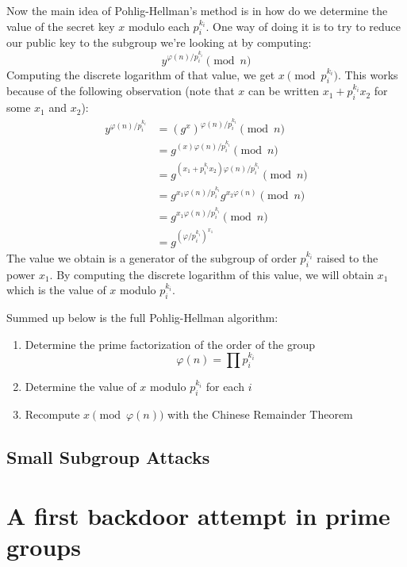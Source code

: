 \documentclass[a4paper,11pt,twocolumn]{article}
\begin{document}
Now the main idea of Pohlig-Hellman's method is in how do we determine the value of the secret key $x$ modulo each $p_i^{k_i}$. One way of doing it is to try to reduce our public key to the subgroup we're looking at by computing:
$$y^{\varphi(n)/p_i^{k_i}} \pmod{n}$$
Computing the discrete logarithm of that value, we get $x \pmod{p_i^{k_i}}$. This works because of the following observation (note that $x$ can be written $x_1 + p_i^{k_i} x_2$ for some $x_1$ and $x_2$):
\begin{align*}
    y^{\varphi(n)/p_i^{k_i}} &= (g^{x})^{\varphi(n)/p_i^{k_i}} \pmod{n}\\
    &= g^{(x) \varphi(n)/p_i^{k_i}} \pmod{n}\\
    &= g^{(x_1 + p_i^{k_i} x_2) \varphi(n)/p_i^{k_i}} \pmod{n}\\
    &= g^{x_1 \varphi(n)/p_i^{k_i}} g^{x_2 \varphi(n)} \pmod{n}\\
    &= g^{x_1 \varphi(n)/p_i^{k_i}} \pmod{n}\\
    &= g^{(\varphi/p_i^{k_i})^{x_1}}
\end{align*}
The value we obtain is a generator of the subgroup of order $p_i^{k_i}$ raised to the power $x_1$. By computing the discrete logarithm of this value, we will obtain $x_1$ which is the value of $x$ modulo $p_i^{k_i}$.


Summed up below is the full Pohlig-Hellman algorithm:

\begin{enumerate}
    \item Determine the prime factorization of the order of the group
        $$\varphi(n) = \prod p_i^{k_i} $$
    \item Determine the value of $x$ modulo $p_i^{k_i}$ for each $i$
    \item Recompute $x \pmod{\varphi(n)}$ with the Chinese Remainder Theorem
\end{enumerate}

\subsection{Small Subgroup Attacks}


\section{A first backdoor attempt in prime groups}
\end{document}

